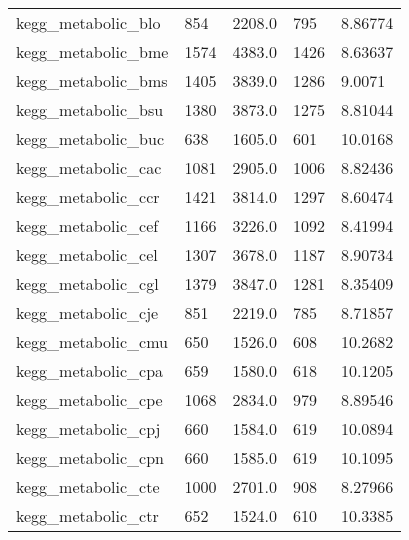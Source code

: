 \begin{longtable}{lllll}
 kegg\_metabolic\_blo                                 & 854        & 2208.0      & 795   & 8.86774    \\
 kegg\_metabolic\_bme                                 & 1574       & 4383.0      & 1426  & 8.63637    \\
 kegg\_metabolic\_bms                                 & 1405       & 3839.0      & 1286  & 9.0071     \\
 kegg\_metabolic\_bsu                                 & 1380       & 3873.0      & 1275  & 8.81044    \\
 kegg\_metabolic\_buc                                 & 638        & 1605.0      & 601   & 10.0168    \\
 kegg\_metabolic\_cac                                 & 1081       & 2905.0      & 1006  & 8.82436    \\
 kegg\_metabolic\_ccr                                 & 1421       & 3814.0      & 1297  & 8.60474    \\
 kegg\_metabolic\_cef                                 & 1166       & 3226.0      & 1092  & 8.41994    \\
 kegg\_metabolic\_cel                                 & 1307       & 3678.0      & 1187  & 8.90734    \\
 kegg\_metabolic\_cgl                                 & 1379       & 3847.0      & 1281  & 8.35409    \\
 kegg\_metabolic\_cje                                 & 851        & 2219.0      & 785   & 8.71857    \\
 kegg\_metabolic\_cmu                                 & 650        & 1526.0      & 608   & 10.2682    \\
 kegg\_metabolic\_cpa                                 & 659        & 1580.0      & 618   & 10.1205    \\
 kegg\_metabolic\_cpe                                 & 1068       & 2834.0      & 979   & 8.89546    \\
 kegg\_metabolic\_cpj                                 & 660        & 1584.0      & 619   & 10.0894    \\
 kegg\_metabolic\_cpn                                 & 660        & 1585.0      & 619   & 10.1095    \\
 kegg\_metabolic\_cte                                 & 1000       & 2701.0      & 908   & 8.27966    \\
 kegg\_metabolic\_ctr                                 & 652        & 1524.0      & 610   & 10.3385    \\

\end{longtable}
